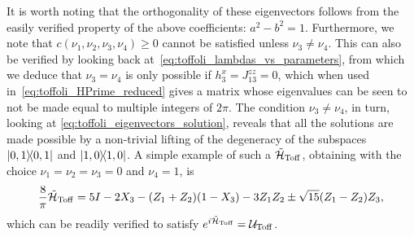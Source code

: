 It is worth noting that the orthogonality of these eigenvectors follows from the easily verified property of the above coefficients: $a^2 - b^2 = 1$.
Furthermore, we note that $c(\nu_1, \nu_2, \nu_3, \nu_4) \ge 0$ cannot be satisfied unless $\nu_3 \neq \nu_4$.
This can also be verified by looking back at~\cref{eq:toffoli_lambdas_vs_parameters}, from which we deduce that $\nu_3=\nu_4$ is only possible if $h_3^x=J_{13}^{zz}=0$, which when used in~\cref{eq:toffoli_HPrime_reduced} gives a matrix whose eigenvalues can be seen to not be made equal to multiple integers of $2\pi$.
The condition $\nu_3\neq\nu_4$, in turn, looking at \cref{eq:toffoli_eigenvectors_solution},
reveals that all the solutions are made possible by a non-trivial lifting of the degeneracy of the subspaces $\ketbra{0,1}$ and $\ketbra{1,0}$.
A simple example of such a $\tilde{\mathcal{H}}_{\operatorname{Toff}}$, obtaining with the choice $\nu_1=\nu_2=\nu_3=0$ and $\nu_4=1$, is
\begin{equation}
    \frac{8}{\pi}\tilde{\mathcal{H}}_{\operatorname{Toff}} =
    5 I - 2 X_3 - (Z_1 + Z_2)(1 - X_3)
    - 3 Z_1 Z_2 \pm \sqrt{15}(Z_1 - Z_2)Z_3,
\end{equation}
which can be readily verified to satisfy $e^{i\tilde{\mathcal{H}}_{\operatorname{Toff}}}=\mathcal{U}_{\operatorname{Toff}}$.

